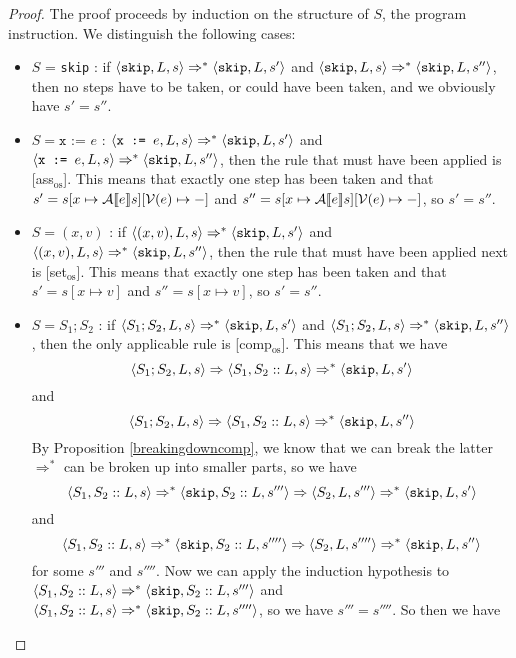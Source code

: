 \begin{proof}
The proof proceeds by induction on the structure of $S$, the program instruction. We distinguish the following cases:
\begin{itemize}[noitemsep]
    \item $S$ = \texttt{skip} : if $\langle \texttt{skip}, L, s \rangle \Rightarrow ^{*} \langle \texttt{skip}, L, s' \rangle$ and $\langle \texttt{skip}, L, s \rangle \Rightarrow ^{*} \langle \texttt{skip}, L, s'' \rangle$, then no steps have to be taken, or could have been taken, and we obviously have $s' = s''$.
    \item $S = \texttt{x := } e$ : $\langle \texttt{x := } e, L, s \rangle \Rightarrow ^{*} \langle \texttt{skip}, L, s' \rangle$ and $\langle \texttt{x := } e, L, s \rangle \Rightarrow ^{*} \langle \texttt{skip}, L, s'' \rangle$, then the rule that must have been applied is [ass$_{\textrm{os}}$]. This means that exactly one step has been taken and that $s'=s[x \mapsto \mathcal{A} \llbracket e \rrbracket s][\mathcal{V}(e)\mapsto-]$ and $s'' = s[x \mapsto \mathcal{A} \llbracket e \rrbracket s][\mathcal{V}(e)\mapsto-]$, so $s' = s''$.
    \item $S = (x,v)$ : if $\langle (x,v), L, s \rangle \Rightarrow ^{*} \langle \texttt{skip}, L, s' \rangle$ and $\langle (x,v), L, s \rangle \Rightarrow ^{*} \langle \texttt{skip}, L, s'' \rangle$, then the rule that must have been applied next is [set$_{\textrm{os}}$]. This means that exactly one step has been taken and that $s' = s[x\mapsto v]$ and $s'' = s[x\mapsto v]$, so $s' = s''$.
    \item $S = S_1; S_2$ : if $\langle S_1; S_2, L, s \rangle \Rightarrow ^{*} \langle \texttt{skip}, L, s' \rangle$ and $\langle S_1; S_2, L, s \rangle \Rightarrow ^{*} \langle \texttt{skip}, L, s'' \rangle$, then the only applicable rule is [comp$_{\textrm{os}}$]. This means that we have 
    $$\langle S_1; S_2, L, s \rangle \Rightarrow \langle S_1, S_2::L, s \rangle \Rightarrow ^{*} \langle \texttt{skip}, L, s' \rangle$$
    and 
    $$\langle S_1; S_2, L, s \rangle \Rightarrow \langle S_1, S_2::L, s \rangle  \Rightarrow ^{*} \langle \texttt{skip}, L, s'' \rangle$$
    By Proposition \ref{breakingdowncomp}, we know that we can break the latter $\Rightarrow ^{*}$ can be broken up into smaller parts, so we have 
     $$\langle S_1, S_2::L, s \rangle \Rightarrow ^{*} \langle \texttt{skip}, S_2::L, s''' \rangle \Rightarrow \langle S_2, L, s''' \rangle \Rightarrow ^{*} \langle \texttt{skip}, L, s' \rangle$$
     and
     $$\langle S_1, S_2::L, s \rangle \Rightarrow ^{*} \langle \texttt{skip}, S_2::L, s'''' \rangle \Rightarrow \langle S_2, L, s'''' \rangle \Rightarrow ^{*} \langle \texttt{skip}, L, s'' \rangle$$
     for some $s'''$ and $s''''$. Now we can apply the induction hypothesis to $\langle S_1, S_2::L, s \rangle \Rightarrow ^{*} \langle \texttt{skip}, S_2::L, s''' \rangle$ and $\langle S_1, S_2::L, s \rangle \Rightarrow ^{*} \langle \texttt{skip}, S_2::L, s'''' \rangle$, so we have $s''' = s''''$. So then we have 

\end{itemize}
\end{proof}
